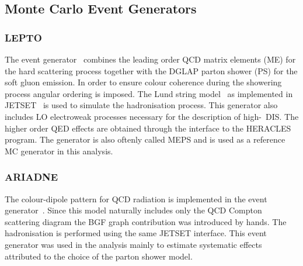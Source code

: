 \subsection{Monte Carlo Event Generators}
\subsubsection{LEPTO}
The \lepto event generator~\cite{lepto} combines the leading order QCD matrix elements (ME) for the hard scattering process together with the DGLAP parton shower (PS) for the soft gluon emission. In order to ensure colour coherence during the showering process angular ordering is imposed. The Lund string model~\cite{lund} as implemented in JETSET~\cite{jetset} is used to simulate the hadronisation process. This generator also includes LO electroweak processes necessary for the description of high-\qsq~DIS. The higher order QED effects are obtained through the interface to the HERACLES~\cite{heracles} program. The \lepto generator is also oftenly called MEPS and is used as a reference MC generator in this analysis.
\subsubsection{ARIADNE}
The colour-dipole pattern for QCD radiation is implemented in the \ariadne event generator~\cite{ariadne}. Since this model naturally includes only the QCD Compton scattering diagram the BGF graph contribution was introduced by hands. The hadronisation is performed using the same JETSET interface. This event generator was used in the analysis mainly to estimate systematic effects attributed to the choice of the parton shower model.
%